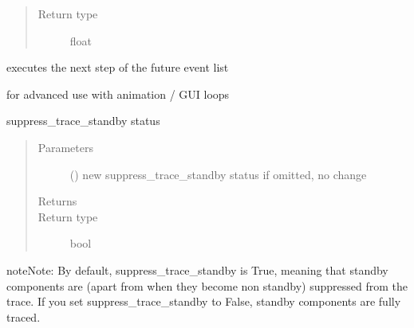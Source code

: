 \documentclass[letterpaper,10pt,english]{sphinxmanual}
\begin{document}
\begin{fulllineitems}
\begin{fulllineitems}
\begin{quote}
\begin{description}
\item[{Return type}] \leavevmode
float

\end{description}\end{quote}

\end{fulllineitems}


\begin{fulllineitems}
\label{\detokenize{Reference:salabim.Environment.step}}
executes the next step of the future event list

for advanced use with animation / GUI loops

\end{fulllineitems}


\begin{fulllineitems}
\label{\detokenize{Reference:salabim.Environment.suppress_trace_standby}}
suppress\_trace\_standby status
\begin{quote}\begin{description}
\item[{Parameters}] \leavevmode
{} () \textendash{} new suppress\_trace\_standby status 
if omitted, no change

\item[{Returns}] \leavevmode
{}

\item[{Return type}] \leavevmode
bool

\end{description}\end{quote}

\begin{sphinxadmonition}{note}{Note:}
By default, suppress\_trace\_standby is True, meaning that standby components are
(apart from when they become non standby) suppressed from the trace. 
If you set suppress\_trace\_standby to False, standby components are fully traced.
\end{sphinxadmonition}

\end{fulllineitems}


\end{fulllineitems}
\end{document}
